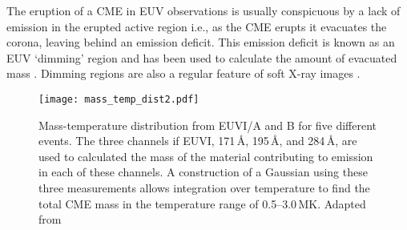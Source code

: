 The eruption of a CME in EUV observations is usually conspicuous by a lack of emission in the erupted active region i.e., as the CME erupts it evacuates the corona, leaving behind an emission deficit. This emission deficit is known as an EUV `dimming' region and has been used to calculate the amount of evacuated mass \citep{aschw09}. Dimming regions are also a regular feature of soft X-ray images \citep{sterling1997}.
%
%
%
\begin{figure}[t!]
\begin{center}
\texttt{[image: mass\_temp\_dist2.pdf]}
\caption[Mass-temperature distribution]{Mass-temperature distribution from EUVI/A and B for five different events. The three channels if EUVI, 171\,\AA, 195\,\AA, and 284\,\AA, are used to calculated the mass of the material contributing to emission in each of these channels. A construction of a Gaussian using these three measurements allows integration over temperature to find the total CME mass in the temperature range of 0.5--3.0\,MK. Adapted from \citet{aschw09}}
\label{fig:euvi_mass}
\end{center}
\end{figure}



